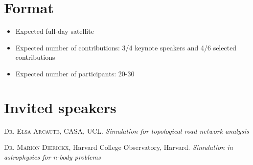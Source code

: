 \documentclass[11pt]{article}
\newcommand{\noun}[1]{\textsc{#1}}
\begin{document}


\section*{Format}

\begin{itemize}
	\item Expected full-day satellite
	\item Expected number of contributions: 3/4 keynote speakers and 4/6 selected contributions
	\item Expected number of participants: 20-30
\end{itemize}






\section*{Invited speakers}

\noindent\noun{Dr. Elsa Arcaute}, CASA, UCL. \textit{Simulation for topological road network analysis}

\noindent\noun{Dr. Marion Dierickx}, Harvard College Observatory, Harvard. \textit{Simulation in astrophysics for n-body problems}
\end{document}
